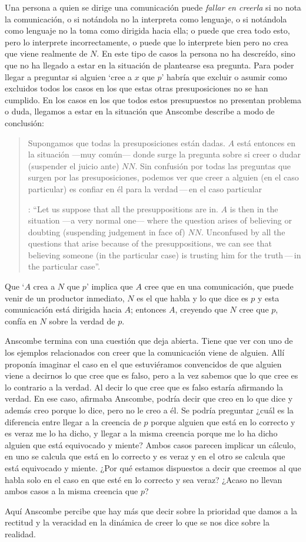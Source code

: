 Una persona a quien se dirige una comunicación puede \emph{fallar en creerla} si no nota la comunicación, o si notándola no la interpreta como lenguaje, o si notándola como lenguaje no la toma como dirigida hacia ella; o puede que crea todo esto, pero lo interprete incorrectamente, o puede que lo interprete bien pero no crea que viene realmente de $N$. En este tipo de casos la persona no ha descreído, sino que no ha llegado a estar en la situación de plantearse esa pregunta. Para poder llegar a preguntar si alguien `cree a $x$ que $p$' habría que excluir o asumir como excluidos todos los casos en los que estas otras presuposiciones no se han cumplido. En los casos en los que todos estos presupuestos no presentan problema o duda, llegamos a estar en la situación que Anscombe describe a modo de conclusión: \blockquote[{\Cite[9]{anscombe2008faith:tobelieve}}: \enquote{Let us suppose that all the presuppositions are in. $A$ is then in the situation ---a very normal one--- where the question arises of believing or doubting (suspending judgement in face of) $NN$. Unconfused by all the questions that arise because of the presuppositions, we can see that believing someone (in the particular case) is trusting him for the truth\,---\,in the particular case}.]{Supongamos que todas la presuposiciones están dadas. $A$ está entonces en la situación ---muy común--- donde surge la pregunta sobre si creer o dudar (suspender el juicio ante) $NN$. Sin confusión por todas las preguntas que surgen por las presuposiciones, podemos ver que creer a alguien (en el caso particular) es confiar en él para la verdad\,---\,en el caso particular}. Que `$A$ crea a $N$ que $p$' implica que $A$ cree que en una comunicación, que puede venir de un productor inmediato, $N$ es el que habla y lo que dice es $p$ y esta comunicación está dirigida hacia $A$; entonces $A$, creyendo que $N$ cree que $p$, confía en $N$ sobre la verdad de $p$.

Anscombe termina con una cuestión que deja abierta. Tiene que ver con uno de los ejemplos relacionados con creer que la comunicación viene de alguien. Allí proponía imaginar el caso en el que estuviéramos convencidos de que alguien viene a decirnos lo que cree que es falso, pero a la vez sabemos que lo que cree es lo contrario a la verdad. Al decir lo que cree que es falso estaría afirmando la verdad. En ese caso, afirmaba Anscombe, podría decir que creo en lo que dice y además creo porque lo dice, pero no le creo a él. Se podría preguntar ¿cuál es la diferencia entre llegar a la creencia de $p$ porque alguien que está en lo correcto y es veraz me lo ha dicho, y llegar a la misma creencia porque me lo ha dicho alguien que está equivocado y miente? Ambos casos parecen implicar un cálculo, en uno se calcula que está en lo correcto y es veraz y en el otro se calcula que está equivocado y miente. ¿Por qué estamos dispuestos a decir que creemos al que habla solo en el caso en que esté en lo correcto y sea veraz? ¿Acaso no llevan ambos casos a la misma creencia que $p$?

Aquí Anscombe percibe que hay más que decir sobre la prioridad que damos a la rectitud y la veracidad en la dinámica de creer lo que se nos dice sobre la realidad.

